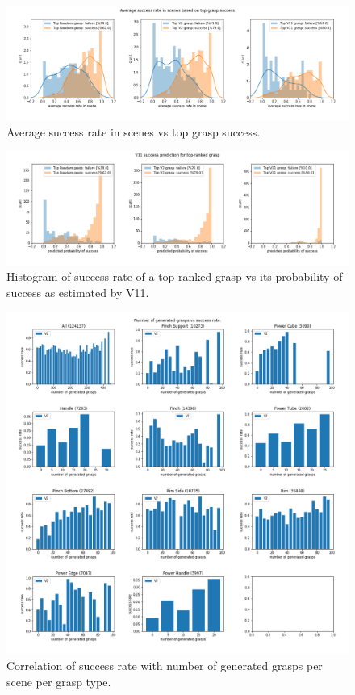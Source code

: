 \begin{figure}
\centering
\includegraphics[width=0.8\columnwidth]{images/post-analysis/Average_success_rate_in_scenes_based_on_top_grasp_success.png}
\caption{Average success rate in scenes vs top grasp success.}
\label{fig:post7}
\end{figure}

\begin{figure}
\centering
\includegraphics[width=0.8\columnwidth]{images/post-analysis/V11_success_prediction_for_top-ranked_grasp.png}
\caption{Histogram of success rate of a top-ranked grasp vs its probability of success as estimated by V11.}
\label{fig:post8}
\end{figure}

\begin{figure}
\centering
\includegraphics[width=0.8\columnwidth]{images/post-analysis/number_of_generated_grasps_vs_success_rate.png}
\caption{Correlation of success rate with number of generated grasps per scene per grasp type.}
\label{fig:post10}
\end{figure}

